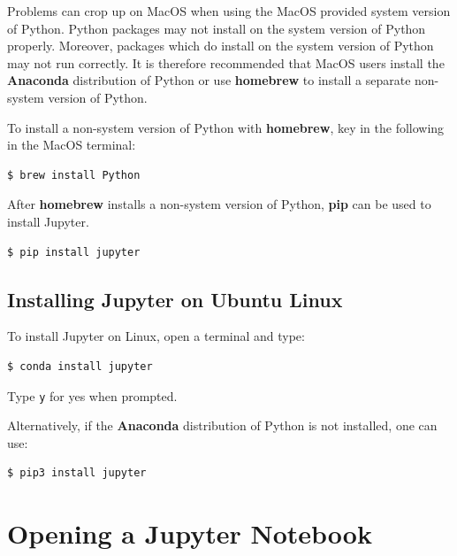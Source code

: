 \documentclass{book}
\begin{document}
Problems can crop up on MacOS when using the MacOS provided system
version of Python. Python packages may not install on the system version
of Python properly. Moreover, packages which do install on the system
version of Python may not run correctly. It is therefore recommended
that MacOS users install the \textbf{Anaconda} distribution of Python or
use \textbf{homebrew} to install a separate non-system version of
Python.

To install a non-system version of Python with \textbf{homebrew}, key in
the following in the MacOS terminal:

\begin{lstlisting}
$ brew install Python
\end{lstlisting}

After \textbf{homebrew} installs a non-system version of Python,
\textbf{pip} can be used to install Jupyter.

\begin{lstlisting}
$ pip install jupyter
\end{lstlisting}
    




    
        \subsection{Installing Jupyter on Ubuntu
Linux}\label{installing-jupyter-on-ubuntu-linux}

To install Jupyter on Linux, open a terminal and type:

\begin{lstlisting}
$ conda install jupyter
\end{lstlisting}

Type \lstinline!y! for yes when prompted.

Alternatively, if the \textbf{Anaconda} distribution of Python is not
installed, one can use:

\begin{lstlisting}
$ pip3 install jupyter
\end{lstlisting}
    




    
        \section{Opening a Jupyter Notebook}\label{opening-a-jupyter-notebook}
    
\end{document}

